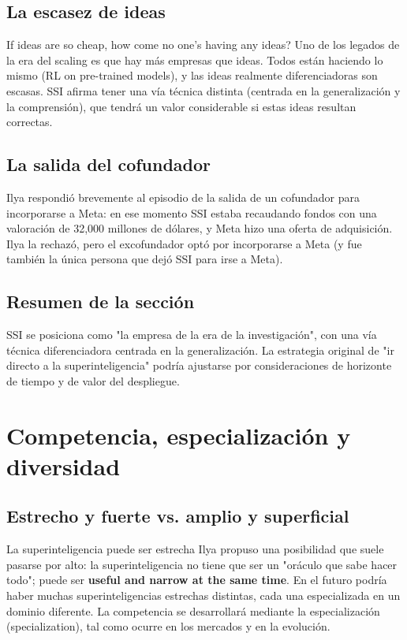 \documentclass[a4paper]{article}
\begin{document}
\subsection{La escasez de ideas}

\begin{importantbox}{If ideas are so cheap, how come no one's having any ideas?}
Uno de los legados de la era del scaling es que hay más empresas que ideas. Todos están haciendo lo mismo (RL on pre-trained models), y las ideas realmente diferenciadoras son escasas. SSI afirma tener una vía técnica distinta (centrada en la generalización y la comprensión), que tendrá un valor considerable si estas ideas resultan correctas.
\end{importantbox}

\subsection{La salida del cofundador}

Ilya respondió brevemente al episodio de la salida de un cofundador para incorporarse a Meta: en ese momento SSI estaba recaudando fondos con una valoración de 32,000 millones de dólares, y Meta hizo una oferta de adquisición. Ilya la rechazó, pero el excofundador optó por incorporarse a Meta (y fue también la única persona que dejó SSI para irse a Meta).

\subsection{Resumen de la sección}

SSI se posiciona como "la empresa de la era de la investigación", con una vía técnica diferenciadora centrada en la generalización. La estrategia original de "ir directo a la superinteligencia" podría ajustarse por consideraciones de horizonte de tiempo y de valor del despliegue.

\section{Competencia, especialización y diversidad}

\subsection{Estrecho y fuerte vs. amplio y superficial}

\begin{importantbox}{La superinteligencia puede ser estrecha}
Ilya propuso una posibilidad que suele pasarse por alto: la superinteligencia no tiene que ser un "oráculo que sabe hacer todo"; puede ser \textbf{useful and narrow at the same time}. En el futuro podría haber muchas superinteligencias estrechas distintas, cada una especializada en un dominio diferente. La competencia se desarrollará mediante la especialización (specialization), tal como ocurre en los mercados y en la evolución.
\end{importantbox}
\end{document}
